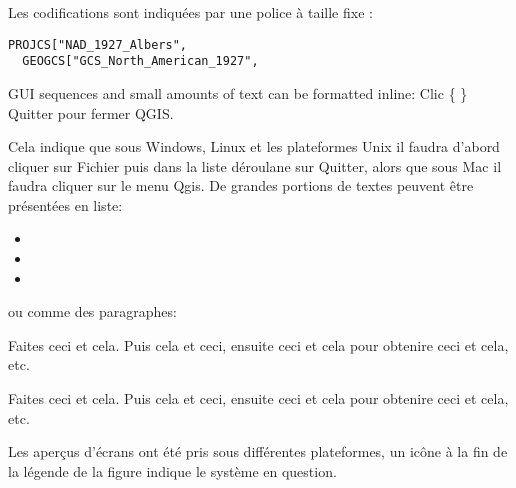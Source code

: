 Les codifications sont indiquées par une police à taille fixe :
\begin{verbatim}
PROJCS["NAD_1927_Albers",
  GEOGCS["GCS_North_American_1927",
\end{verbatim}


GUI sequences and small amounts of text can be formatted inline: Clic
\{\nix{} \} \fleche Quitter pour fermer QGIS. 

Cela indique que sous Windows, Linux et les plateformes Unix il faudra d'abord cliquer sur Fichier puis dans la liste déroulane sur Quitter, alors que sous Mac il faudra cliquer sur le menu Qgis. De grandes portions de textes peuvent être présentées en liste:

\begin{itemize}[label=--]
\item {}
\item {}
\item {}
\end{itemize}

ou comme des paragraphes:

\nix{} \osx{} Faites ceci et cela. Puis cela et ceci, ensuite ceci et cela pour obtenire ceci et cela, etc. 

\win{}Faites ceci et cela. Puis cela et ceci, ensuite ceci et cela pour obtenire ceci et cela, etc. 

Les aperçus d'écrans ont été pris sous différentes plateformes, un icône à la fin de la légende de la figure indique le système en question.



